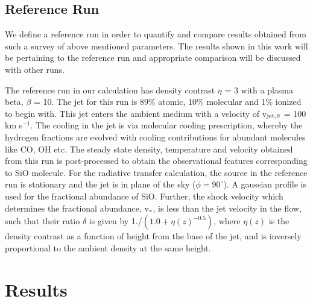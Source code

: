 \documentclass[useAMS,usenatbib,letters]{mn2e}
\begin{document}
\subsection{Reference Run}
\label{ssec:refrun}
We define a reference run in order to quantify and compare results obtained from such a
survey of above mentioned parameters. The results shown in this work will be
pertaining to the reference run and appropriate comparison will be
discussed with other runs.
%

The reference run in our calculation has density contrast $\eta$ = 3
with a plasma beta, $\beta$ = 10. The jet for this run is 89\% atomic,
10\% molecular and 1\% ionized to begin with. This jet enters the
ambient medium with a velocity of v$_{\rm jet,0}$ = 100 km
s$^{-1}$. The cooling in the jet is
via molecular cooling prescription, whereby the hydrogen fractions are
evolved with cooling contributions for abundant molecules like CO, OH
etc. The steady state density, temperature and velocity obtained from this 
run is post-processed to obtain the observational features
corresponding to SiO molecule. 
For the radiative transfer calculation, the source in the reference
run is stationary and the jet is in plane of the sky ($\phi =
90^{\circ}$). A gaussian profile is used for the fractional abundance
of SiO.
Further, the shock velocity which determines
the fractional abundance, v$_{\rm s}$, is less than the jet velocity in the
flow, such that their ratio $\delta$ is given by 1./$(1.0 +
\eta(z)^{-0.5})$, where $\eta(z)$ is the density contrast as a
function of height from the base of the jet, and is inversely proportional to the ambient density at the same height.

\section{Results}
\end{document}
